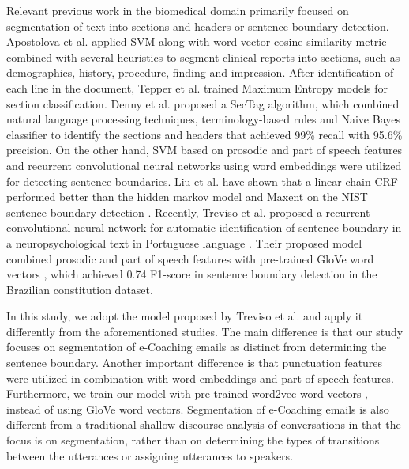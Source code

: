 \documentclass{amia}
\begin{document}
Relevant previous work in the biomedical domain primarily focused on segmentation of text into sections and headers\cite{apostolova2009automatic,denny2009evaluation,tepper2012statistical,cho2002text} or sentence boundary detection\cite{griffis2016quantitative,kreuzthaler2015detection,treviso2017sentence,fraser2015sentence}. Apostolova et al.\cite{apostolova2009automatic} applied SVM along with word-vector cosine similarity metric combined with several heuristics to segment clinical reports into sections, such as demographics, history, procedure, finding and impression. After identification of each line in the document, Tepper et al. \cite{tepper2012statistical} trained Maximum Entropy models for section classification. Denny et al.\cite{denny2009evaluation} proposed a SecTag algorithm, which combined natural language processing techniques, terminology-based rules and Naive Bayes classifier to identify the sections and headers that achieved 99\% recall with 95.6\% precision. On the other hand, SVM based on prosodic and part of speech features \cite{kreuzthaler2015detection} and recurrent convolutional neural networks using word embeddings \cite{griffis2016quantitative} were utilized for detecting sentence boundaries. Liu et al. have shown that a linear chain CRF performed better than the hidden markov model and Maxent on the NIST sentence boundary detection \cite{liu2005using}. Recently, Treviso et al. proposed a recurrent convolutional neural network for automatic identification of sentence boundary in a neuropsychological text in Portuguese language \cite{treviso2017sentence}. Their proposed model combined prosodic and part of speech features with pre-trained GloVe word vectors \cite{pennington2014glove}, which achieved 0.74 F1-score in sentence boundary detection in the Brazilian constitution dataset. 

In this study, we adopt the model proposed by Treviso et al. \cite{treviso2017sentence} and apply it differently from the aforementioned studies. The main difference is that our study focuses on segmentation of e-Coaching emails as distinct from determining the sentence boundary. Another important difference is that punctuation features were utilized in combination with word embeddings and part-of-speech features. Furthermore, we train our model with pre-trained word2vec word vectors \cite{mikolov2013distributed}, instead of using GloVe word vectors. Segmentation of e-Coaching emails is also different from a traditional shallow discourse analysis of conversations \cite{galley2003discourse} in that the focus is on segmentation, rather than on determining the types of transitions between the utterances or assigning utterances to speakers.
\end{document}
